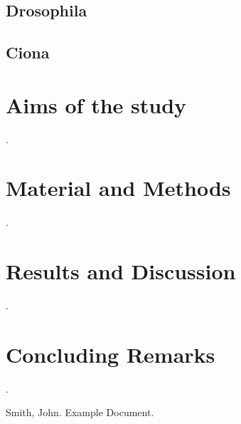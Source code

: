 \documentclass[officiallayout]{tktla_modified}
\begin{document}
	\section{Drosophila}
	

	\section{Ciona}
	


\chapter{Aims of the study}
.


\chapter{Material and Methods}
.


\chapter{Results and Discussion}
.



\chapter{Concluding Remarks}
.


\listoffigures


\begin{thebibliography}{00}
\item Smith, John. Example Document.
\end{thebibliography}

\end{document}
